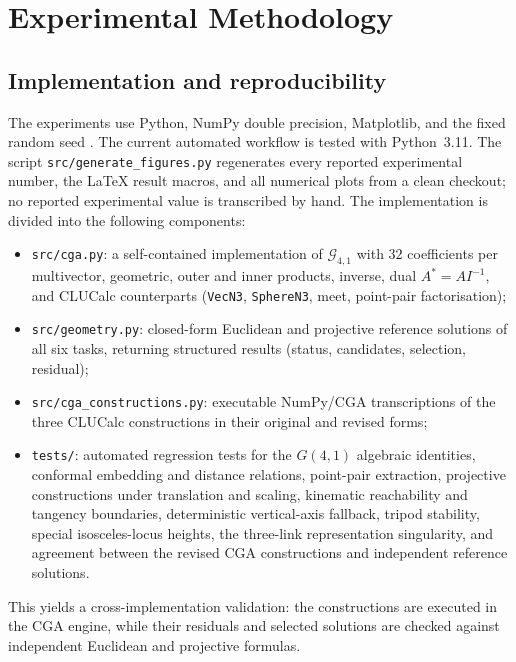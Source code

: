 \documentclass[11pt,a4paper]{article}
\theoremstyle{plain}
\theoremstyle{definition}
\theoremstyle{remark}
\newcommand{\GA}{\mathcal{G}_{4,1}}
\begin{document}
\section{Experimental Methodology}\label{sec:experiments}

\subsection{Implementation and reproducibility}

The experiments use Python, NumPy double precision, Matplotlib, and the fixed
random seed \ExperimentSeed. The current automated workflow is tested with
Python~3.11. The script \texttt{src/generate\_figures.py} regenerates every reported
experimental number, the LaTeX result macros, and all numerical plots from a
clean checkout; no reported experimental value is transcribed by hand. The implementation is divided
into the following components:
\begin{itemize}
  \item \texttt{src/cga.py}: a self-contained implementation of $\GA$ with
        $32$ coefficients per multivector, geometric, outer and inner products,
        inverse, dual $A^*=AI^{-1}$, and CLUCalc counterparts
        (\texttt{VecN3}, \texttt{SphereN3}, meet, point-pair factorisation);
  \item \texttt{src/geometry.py}: closed-form Euclidean and projective
        reference solutions of all six tasks, returning structured results
        (status, candidates, selection, residual);
  \item \texttt{src/cga\_constructions.py}: executable NumPy/CGA
        transcriptions of the three CLUCalc constructions in their original and
        revised forms;
  \item \texttt{tests/}: automated regression tests for the $G(4,1)$
        algebraic identities, conformal embedding and distance relations,
        point-pair extraction, projective constructions under translation and
        scaling, kinematic reachability and tangency boundaries, deterministic
        vertical-axis fallback, tripod stability, special isosceles-locus
        heights, the three-link representation singularity, and agreement
        between the revised CGA constructions and independent reference
        solutions.
\end{itemize}
This yields a cross-implementation validation: the constructions are executed
in the CGA engine, while their residuals and selected solutions are checked
against independent Euclidean and projective formulas.
\end{document}
